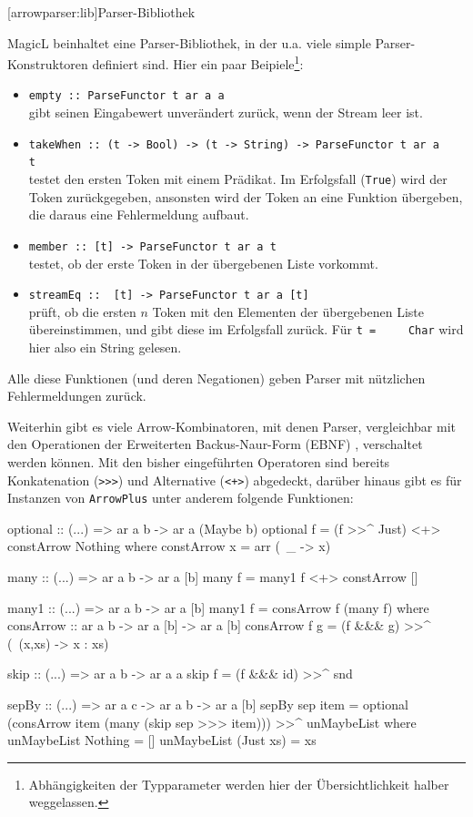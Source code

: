 \documentclass[12pt, a4paper, bibgerm]{scrbook}
\newenvironment{DIFnomarkup}{}{}
\newcommand\icode[1]{\lstinline?#1?}
\newcommand\lsection{}
\begin{document}
\lsection[arrowparser:lib]{Parser-Bibliothek}

MagicL beinhaltet eine Parser-Bibliothek, in der u.a. viele simple
Parser-Konstruktoren definiert sind. Hier ein paar
Beipiele\footnote{Abhängigkeiten der Typparameter werden hier der
  Übersichtlichkeit halber weggelassen.}:
\begin{itemize}
\item \icode{empty :: ParseFunctor t ar a a}\\
  gibt seinen Eingabewert unverändert zurück, wenn der Stream leer ist.
\item \icode{takeWhen :: (t -> Bool) -> (t -> String) -> ParseFunctor t ar a
    t}\\
  testet den ersten Token mit einem Prädikat. Im Erfolgsfall (\icode{True}) wird der
  Token zurückgegeben, ansonsten wird der Token an eine Funktion
  übergeben, die daraus eine Fehlermeldung aufbaut.
\item \icode{member :: [t] -> ParseFunctor t ar a t}\\
  testet, ob der erste Token in der übergebenen Liste vorkommt.
\item \icode{streamEq ::  [t] -> ParseFunctor t ar a [t]}\\
  prüft, ob die ersten $n$ Token mit den Elementen der übergebenen Liste
  übereinstimmen, und gibt diese im Erfolgsfall zurück. Für \icode{t =
    Char} wird hier also ein String gelesen.
\end{itemize}

Alle diese Funktionen (und deren Negationen) geben Parser mit nützlichen
Fehlermeldungen zurück.

Weiterhin gibt es viele Arrow-Kombinatoren, mit denen Parser,
vergleichbar mit den Operationen der Erweiterten Backus-Naur-Form (EBNF)
\cite[S.43ff]{EBNF}, verschaltet werden können. Mit den bisher eingeführten
Operatoren sind bereits Konkatenation (\icode{>>>}) %
und Alternative (\icode{<+>}) abgedeckt, darüber hinaus gibt es für
Instanzen von \icode{ArrowPlus} unter anderem folgende Funktionen:

\begin{DIFnomarkup}\begin{code}
optional :: (...) => ar a b -> ar a (Maybe b)
optional f = (f >>^ Just) <+> constArrow Nothing
  where constArrow x = arr (\ _ -> x)

many :: (...) => ar a b -> ar a [b]
many f = many1 f <+> constArrow []

many1 :: (...) => ar a b -> ar a [b]
many1 f = consArrow f (many f)
  where consArrow :: ar a b -> ar a [b] -> ar a [b]
        consArrow f g = (f &&& g) >>^ (\ (x,xs) -> x : xs)

skip :: (...) => ar a b -> ar a a
skip f = (f &&& id) >>^ snd

sepBy :: (...) => ar a c -> ar a b -> ar a [b]
sepBy sep item =
  optional (consArrow item (many (skip sep >>> item))) >>^ unMaybeList
    where
      unMaybeList  Nothing  = []
      unMaybeList (Just xs) = xs
\end{code}\end{DIFnomarkup} %
\end{document}

